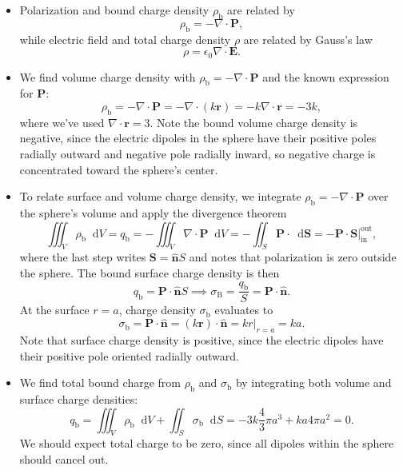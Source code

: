 \documentclass[11pt, a4paper]{article}
\newcommand{\diff}{\mathop{}\!\mathrm{d}} %
\renewcommand{\vec}[1]{\bm{#1}} %
\newcommand{\uvec}[1]{\hat{\vec{#1}}} %
\renewcommand{\r}{\vec{r}}
\newcommand{\E}{\vec{E}}  %
\newcommand{\ee}{\epsilon_{0}}  %
\renewcommand{\P}{\vec{P}}  %
\renewcommand{\div}{\nabla \cdot}
\begin{document}
\begin{itemize}
	\item Polarization and bound charge density $ \rho_{\text{b}} $ are related by
	\begin{equation*}
		\rho_{\text{b}} = - \div \P,
	\end{equation*}
	while electric field and total charge density $ \rho $ are related by Gauss's law
	\begin{equation*}
		\rho = \ee \div \E.
	\end{equation*}
	
	\item We find volume charge density with $ \rho_{\text{b}} = - \div \P $ and the known expression for $ \P $:
	\begin{equation*}
		\rho_{\text{b}} = - \div \P = - \div (k \r) = -k \div \r = - 3k,
	\end{equation*}
	where we've used $ \div \r = 3 $. Note the bound volume charge density is negative, since the electric dipoles in the sphere have their positive poles radially outward and negative pole radially inward, so negative charge is concentrated toward the sphere's center.

	
	\item To relate surface and volume charge density, we integrate $ \rho_{\text{b}} = - \div \P $ over the sphere's volume and apply the divergence theorem
	\begin{equation*}
		\iiint_{V} \rho_{\text{b}}\diff V = q_{\text{b}} = - \iiint_{V}\div \P \diff V = - \iint_{S}\P \cdot \diff \vec{S} = - \P \cdot \vec{S} \big |_{\text{in}}^{\text{out}},
	\end{equation*}
	where the last step writes $ \vec{S} = \uvec{n}S $ and notes that polarization is zero outside the sphere. The bound surface charge density is then
	\begin{equation*}
		q_{\text{b}} = \P \cdot \uvec{n} S \implies \sigma_{\text{B}} = \frac{q_{\text{b}}}{S} = \P \cdot \uvec{n}.
	\end{equation*}
	At the surface $ r = a $, charge density $ \sigma_{\text{b}} $ evaluates to
	\begin{equation*}
		\sigma_{\text{b}} = \P \cdot \uvec{n} = (k \r) \cdot \uvec{n} = k r \big |_{r = a}  = k a.
	\end{equation*}
	Note that surface charge density is positive, since the electric dipoles have their positive pole oriented radially outward. 
	
	\item We find total bound charge from $ \rho_{\text{b}} $ and $ \sigma_{\text{b}} $ by integrating both volume and surface charge densities:
	\begin{equation*}
		q_{\text{b}} = \iiint_{V} \rho_{\text{b}} \diff V + \iint_{S} \sigma_{\text{b}} \diff S = - 3k \frac{4}{3}\pi a^{3} + ka 4\pi a^{2} = 0.
	\end{equation*} 
	We should expect total charge to be zero, since all dipoles within the sphere should cancel out.
\end{itemize}	
	
\end{document}
